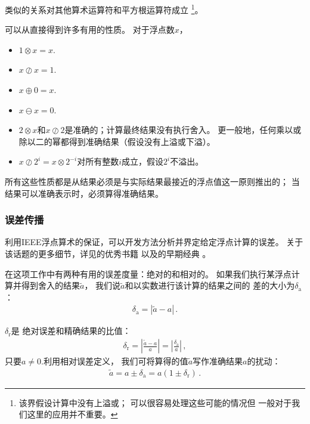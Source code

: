 类似的关系对其他算术运算符和平方根运算符成立
\footnote{该界假设计算中没有上溢或\protect{}；
    可以很容易处理这些可能的情况\citep[p.56]{doi:10.1137/1.9780898718027}但
    一般对于我们这里的应用并不重要。}。

可以从直接得到许多有用的性质。
对于浮点数$x$，
\begin{itemize}
    \item $1\otimes x=x$.
    \item $x\oslash x=1$.
    \item $x\oplus 0=x$.
    \item $x\ominus x=0$.
    \item $2\otimes x$和$x\oslash 2$是准确的；计算最终结果没有执行舍入。
          更一般地，任何乘以或除以二的幂都得到准确结果（假设没有上溢或下溢）。
    \item $x\oslash 2^i=x\otimes 2^{-i}$对所有整数$i$成立，假设$2^i$不溢出。
\end{itemize}

所有这些性质都是从结果必须是与实际结果最接近的浮点值这一原则推出的；
当结果可以准确表示时，必须算得准确结果。

\subsubsection*{误差传播}
利用IEEE浮点算术的保证，可以开发方法分析并界定给定浮点计算的误差。
关于该话题的更多细节，详见\citet{doi:10.1137/1.9780898718027}的优秀书籍
以及\citet{10.5555/1096474}的早期经典
。

在这项工作中有两种有用的误差度量：绝对的和相对的。
如果我们执行某浮点计算并得到舍入的结果$\tilde{a}$，
我们说$\tilde{a}$和以实数进行该计算的结果之间的
差的大小为$\delta_{\mathrm{a}}$：
\begin{align*}
    \delta_{\mathrm{a}}=|\tilde{a}-a|\, .
\end{align*}

$\delta_{\mathrm{r}}$是
绝对误差和精确结果的比值：
\begin{align}\label{eq:3.9}
    \delta_{\mathrm{r}}=\left|\frac{\tilde{a}-a}{a}\right|=\left|\frac{\delta_{\mathrm{a}}}{a}\right|\, ,
\end{align}
只要$a\neq0$.利用相对误差定义，
我们可将算得的值$\tilde{a}$写作准确结果$a$的扰动：
\begin{align*}
    \tilde{a}=a\pm\delta_{\mathrm{a}}=a(1\pm\delta_{\mathrm{r}})\, .
\end{align*}

